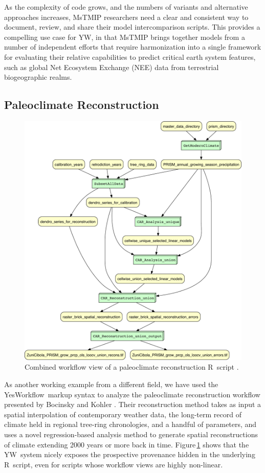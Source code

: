 \documentclass{article}
\newcommand{\YW}{\textsf{YesWorkflow}}
\newcommand{\yw}{\textsf{YW}}
\newcommand{\R}{\textsf{R}}
\newcommand{\figref}[1]{Figure\,\ref{#1}}
\begin{document}
As the complexity of code grows, and the numbers of variants and
alternative approaches increases, MsTMIP researchers need a clear and
consistent way to document, review, and share their model
intercomparison scripts. This provides a compelling use case for \yw,
in that MsTMIP brings together models from a number of independent
efforts that require harmonization into a single framework for
evaluating their relative capabilities to predict critical earth
system features, such as global Net Ecosystem Exchange (NEE) data from
terrestrial biogeographic realms.




 \subsection{Paleoclimate Reconstruction}

 \begin{figure}[t]
   \centering
   \includegraphics[width=.7\textwidth]{figures/SKOPE_combined-crop.pdf}
   \caption{Combined workflow view of a paleoclimate reconstruction
     \R\ script \protect\cite{bocinsky2014}.}
   \label{fig-skope}
 \end{figure}

 As another working example from a different field, we have used the
 \YW\ markup syntax to analyze the paleoclimate reconstruction
 workflow presented by Bocinsky and Kohler \cite{bocinsky2014}. Their
 reconstruction method takes as input a spatial interpolation of
 contemporary weather data, the long-term record of climate held in
 regional tree-ring chronologies, and a handful of parameters, and
 uses a novel regression-based analysis method to generate spatial
 reconstructions of climate extending 2000 years or more back in
 time. \figref{fig-skope} shows that the \yw\ system nicely exposes
 the prospective provenance hidden in the underlying \R\ script, even
 for scripts whose workflow views are highly non-linear.
\end{document}
